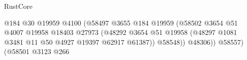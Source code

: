 \begin{lexlean}{RustCore}
\begin{coremodule}
                                                                    @184
                                                                    @30
                                                                    @19959
                                                                    @4100
                                                                    (@58497
                                                                      @3655
                                                                      @184
                                                                      @19959
                                                                      (@58502
                                                                        @3654
                                                                        @51
                                                                        @4007
                                                                        @19958
                                                                        @18403
                                                                        @27973
                                                                        (@48292
                                                                          @3654
                                                                          @51
                                                                          @19958
                                                                          (@48297
                                                                            @1081
                                                                            @3481
                                                                            @11
                                                                            @50
                                                                            @4927
                                                                            @19397
                                                                            @62917
                                                                            @61387))
                                                                        @58548))
                                                                    @48306))
                                                                @58557)
                                                              (@58501
                                                                @3123
                                                                @266

\end{coremodule}
\end{lexlean}
